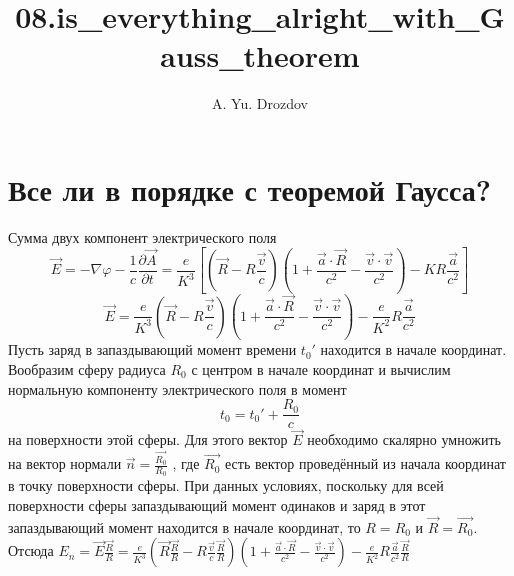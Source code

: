 \documentclass[11pt]{article}
\author{A. Yu. Drozdov}
\title{08.is\_everything\_alright\_with\_Gauss\_theorem}
\begin{document}
    
    \maketitle
    
    

    
    \section{Все ли в порядке с теоремой
Гаусса?}\label{ux432ux441ux435-ux43bux438-ux432-ux43fux43eux440ux44fux434ux43aux435-ux441-ux442ux435ux43eux440ux435ux43cux43eux439-ux433ux430ux443ux441ux441ux430}

Сумма двух компонент электрического поля
\[\overrightarrow{E}=-\nabla \varphi -\frac{1}{c}\frac{\partial \overrightarrow{A}}{\partial t}=\frac{e}{{{K}^{3}}}\left[ \left( \overrightarrow{R}-R\frac{\overrightarrow{v}}{c} \right)\left( 1+\frac{\overrightarrow{a}\cdot \overrightarrow{R}}{{{c}^{2}}}-\frac{\overrightarrow{v}\cdot \overrightarrow{v}}{{{c}^{2}}} \right)-KR\frac{\overrightarrow{a}}{{{c}^{2}}} \right]\]
\[\overrightarrow{E}=\frac{e}{{{K}^{3}}}\left( \overrightarrow{R}-R\frac{\overrightarrow{v}}{c} \right)\left( 1+\frac{\overrightarrow{a}\cdot \overrightarrow{R}}{{{c}^{2}}}-\frac{\overrightarrow{v}\cdot \overrightarrow{v}}{{{c}^{2}}} \right)-\frac{e}{{{K}^{2}}}R\frac{\overrightarrow{a}}{{{c}^{2}}}\]
Пусть заряд в запаздывающий момент времени \({{t}_{0}}'\) находится в
начале координат. Вообразим сферу радиуса \({{R}_{0}}\) с центром в
начале координат и вычислим нормальную компоненту электрического поля в
момент \[{{t}_{0}}={{t}_{0}}'+\frac{{{R}_{0}}}{c}\] на поверхности этой
сферы. Для этого вектор \(\overrightarrow{E}\) необходимо скалярно
умножить на вектор нормали
\(\overrightarrow{n}=\frac{\overrightarrow{{{R}_{0}}}}{{{R}_{0}}}\) ,
где \(\overrightarrow{{{R}_{0}}}\) есть вектор проведённый из начала
координат в точку поверхности сферы. При данных условиях, поскольку для
всей поверхности сферы запаздывающий момент одинаков и заряд в этот
запаздывающий момент находится в начале координат, то \(R={{R}_{0}}\) и
\(\overrightarrow{R}=\overrightarrow{{{R}_{0}}}\). Отсюда
\({{E}_{n}}=\overrightarrow{E}\frac{\overrightarrow{R}}{R}=\frac{e}{{{K}^{3}}}\left( \overrightarrow{R}\frac{\overrightarrow{R}}{R}-R\frac{\overrightarrow{v}}{c}\frac{\overrightarrow{R}}{R} \right)\left( 1+\frac{\overrightarrow{a}\cdot \overrightarrow{R}}{{{c}^{2}}}-\frac{\overrightarrow{v}\cdot \overrightarrow{v}}{{{c}^{2}}} \right)-\frac{e}{{{K}^{2}}}R\frac{\overrightarrow{a}}{{{c}^{2}}}\frac{\overrightarrow{R}}{R}\)
\end{document}
